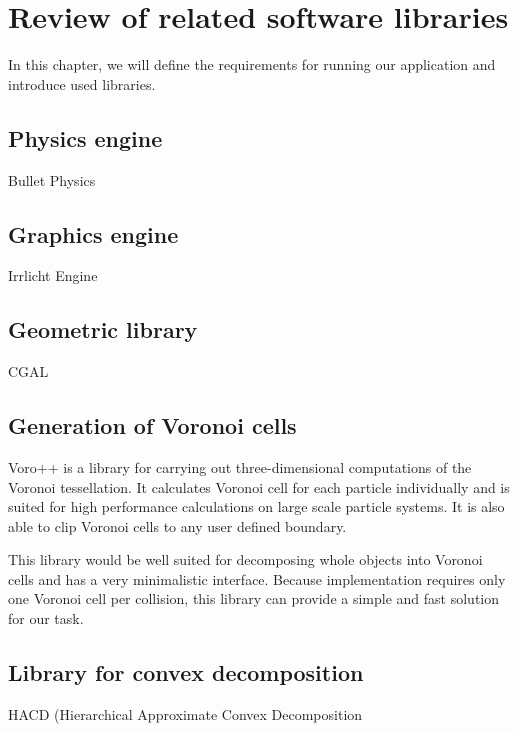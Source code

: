 \chapter{Review of related software libraries}
\label{chapt:technology}
In this chapter, we will define the requirements for running our application and introduce used libraries.


\section{Physics engine}
Bullet Physics


\section{Graphics engine}
Irrlicht Engine

\section{Geometric library}
CGAL

\section{Generation of Voronoi cells}
Voro++ is a library for carrying out three-dimensional computations of the Voronoi tessellation. It calculates Voronoi cell for each particle individually and is suited for high performance calculations on large scale particle systems. It is also able to clip Voronoi cells to any user defined boundary.

This library would be well suited for decomposing whole objects into Voronoi cells and has a very minimalistic interface. Because implementation requires only one Voronoi cell per collision, this library can provide a simple and fast solution for our task.

\section{Library for convex decomposition}
\label{sec:decompositionLib}
HACD (Hierarchical Approximate Convex Decomposition
\cite{HACD}





